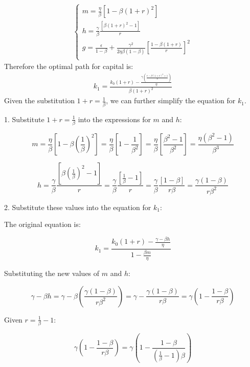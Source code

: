\documentclass[12pt]{report}
\begin{document}
\begin{align*}
    \begin{cases}
        m=\frac{\eta}{\beta}\left[1-\beta(1+r)^2\right] \\
        h=\frac{\gamma}{\beta} \frac{\left[\beta(1+r)^2-1\right]}{r} \\ 
        g=\frac{\epsilon}{1-\beta}+\frac{\gamma^2}{2 \eta \beta(1-\beta)}\left[\frac{1-\beta(1+r)}{r}\right]^2 \\
    \end{cases}
\end{align*}
Therefore the optimal path for capital is:
\begin{align*}
    k_1 = \frac{k_0 (1 + r) - \frac{\gamma \left( \frac{r - \beta (1 + r)^2 + 1}{r} \right)}{\eta}}{\beta (1 + r)^2}
\end{align*}
Given the substitution \( 1 + r = \frac{1}{\beta} \), we can further simplify the equation for \( k_1 \).

1. Substitute \( 1 + r = \frac{1}{\beta} \) into the expressions for \( m \) and \( h \):

\[ m = \frac{\eta}{\beta} \left[ 1 - \beta \left(\frac{1}{\beta}\right)^2 \right] = \frac{\eta}{\beta} \left[ 1 -
\frac{1}{\beta^2} \right] = \frac{\eta}{\beta} \left[ \frac{\beta^2 - 1}{\beta^2} \right] = \frac{\eta (\beta^2 -
1)}{\beta^3} \]


\[ h = \frac{\gamma}{\beta} \frac{\left[ \beta \left(\frac{1}{\beta}\right)^2 - 1 \right]}{r} = \frac{\gamma}{\beta}
\frac{\left[ \frac{1}{\beta} - 1 \right]}{r} = \frac{\gamma}{\beta} \frac{\left[ 1 - \beta \right]}{r \beta} =
\frac{\gamma (1 - \beta)}{r \beta^2} \]


2. Substitute these values into the equation for \( k_1 \):

The original equation is:

\[ k_1 = \frac{k_0 (1 + r) - \frac{\gamma - \beta h}{\eta}}{1 - \frac{\beta m}{\eta}} \]

Substituting the new values of \( m \) and \( h \):

\[ \gamma - \beta h = \gamma - \beta \left( \frac{\gamma (1 - \beta)}{r \beta^2} \right) = \gamma - \frac{\gamma (1 -
\beta)}{r \beta} = \gamma \left( 1 - \frac{1 - \beta}{r \beta} \right) \]


Given \( r = \frac{1}{\beta} - 1 \):

\[ \gamma \left( 1 - \frac{1 - \beta}{r \beta} \right) = \gamma \left( 1 - \frac{1 - \beta}{(\frac{1}{\beta} - 1) \beta} \right) \]
\end{document}
